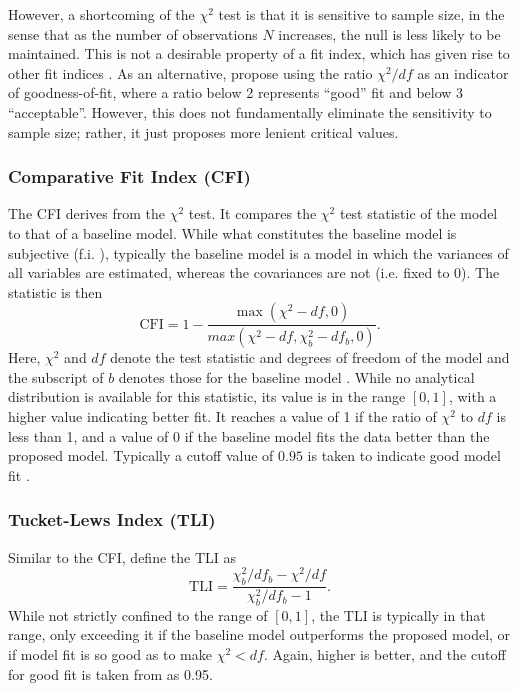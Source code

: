 However, a shortcoming of the $\chi^2$ test is that it is sensitive to sample size, in the sense that as
the number of observations $N$ increases, the null is less likely to be maintained. This is not a
desirable property of a fit index, which has given rise to other fit indices \cite{smith2001primer}.
As an alternative,  propose using the ratio $\chi^2 / df$ as an indicator of goodness-of-fit,
where a ratio below 2 represents ``good'' fit and below 3 ``acceptable''. However, this does not fundamentally eliminate
the sensitivity to sample size; rather, it just proposes more lenient critical values.

\subsubsection{Comparative Fit Index (CFI)}
The CFI derives from the $\chi^2$ test. It compares the $\chi^2$ test statistic of the model to that of a baseline model.
While what constitutes the baseline model is subjective (f.i. ), typically the baseline model is a
model in which the variances of all variables are estimated, whereas the covariances are not (i.e. fixed to 0).
The statistic is then
\begin{equation}
    \text{CFI} = 1 - \frac{\max(\chi^2 - df, 0)}{max(\chi^2 - df, \chi^2_b - df_b, 0)}.
\end{equation}
Here, $\chi^2$ and $df$ denote the test statistic and degrees of freedom of the model and the subscript of $b$ denotes
those for the baseline model \cite{schermelleh2003evaluating}.
While no analytical distribution is available for this statistic, its value is in the range $[0, 1]$, with a
higher value indicating better fit. It reaches a value of 1 if the ratio of $\chi^2$ to $df$ is less than 1,
and a value of 0 if the baseline model fits the data better than the proposed model.
Typically a cutoff value of $0.95$ is taken to indicate good model fit \cite{hu1999cutoff}.

\subsubsection{Tucket-Lews Index (TLI)}
Similar to the CFI,  define the TLI as
\begin{equation}
    \text{TLI} = \frac{\chi_b^2 / df_b - \chi^2 / df}{\chi_b^2 / df_b - 1}.
\end{equation}
While not strictly confined to the range of $[0, 1]$, the TLI is typically in that range, only exceeding it
if the baseline model outperforms the proposed model, or if model fit is so good as to make $\chi^2 < df$.
Again, higher is better, and the cutoff for good fit is taken from  as 0.95.

